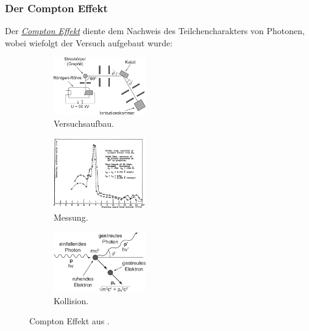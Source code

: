 \documentclass{article}
\begin{document}
    \subsubsection*{Der Compton Effekt}
        Der \href{https://de.wikipedia.org/wiki/Compton-Effekt}{\emph{Compton Effekt}} diente dem Nachweis des Teilchencharakters von Photonen, wobei wiefolgt der Versuch aufgebaut wurde:
        \begin{figure}[H]
            \centering
            \begin{subfigure}[b]{0.3\textwidth}
                \centering
                \includegraphics[width=4cm]{Bilddateien/ComptonAufbau.png}
                \caption{Versuchsaufbau.}
            \end{subfigure}
            \hspace{1cm}
            \begin{subfigure}[b]{0.3\textwidth}
                \centering
                \includegraphics[width=4cm]{Bilddateien/ComptonEffektMessung.png}
                \caption{Messung.}
            \end{subfigure}
            \hspace{1cm}
            \begin{subfigure}[b]{0.3\textwidth}
                \centering
                \includegraphics[width=4cm]{Bilddateien/ComptonKollision.png}
                \caption{Kollision.}
                \label{subfig:ComptonKollision}
            \end{subfigure}
            \caption{Compton Effekt aus \cite{ethz:ImpulsPhoton}.}
        \end{figure}
\end{document}
